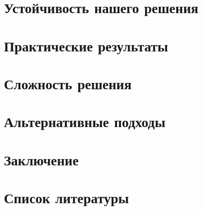 \documentclass[12pt, a4paper]{article}
\begin{document}
\newpage
\section*{Устойчивость нашего решения}



\newpage
\section*{Практические результаты}


\newpage
\section*{Сложность решения}

\newpage
\section*{Альтернативные подходы}

\newpage
\section*{Заключение}

\newpage
\section*{Список литературы}
\end{document}

